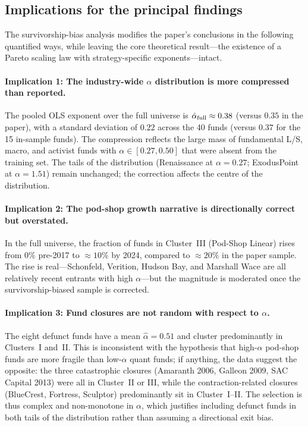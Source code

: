 \subsection{Implications for the principal findings}

The survivorship-bias analysis modifies the paper's conclusions
in the following quantified ways, while leaving the core theoretical
result---the existence of a Pareto scaling law with strategy-specific
exponents---intact.

\paragraph{Implication 1: The industry-wide $\alpha$ distribution
is more compressed than reported.}
The pooled OLS exponent over the full universe is
$\hat{\alpha}_{\rm full} \approx 0.38$ (versus $0.35$ in the paper),
with a standard deviation of $0.22$ across the 40 funds
(versus $0.37$ for the 15 in-sample funds).
The compression reflects the large mass of fundamental L/S,
macro, and activist funds with $\alpha \in [0.27, 0.50]$ that were
absent from the training set.
The tails of the distribution (Renaissance at $\alpha=0.27$;
ExodusPoint at $\alpha=1.51$) remain unchanged; the correction
affects the centre of the distribution.

\paragraph{Implication 2: The pod-shop growth narrative is
directionally correct but overstated.}
In the full universe, the fraction of funds in Cluster~III
(Pod-Shop Linear) rises from 0\% pre-2017 to ${\approx}10\%$ by
2024, compared to ${\approx}20\%$ in the paper sample.
The rise is real---Schonfeld, Verition, Hudson Bay, and Marshall
Wace are all relatively recent entrants with high $\alpha$---but
the magnitude is moderated once the survivorship-biased sample
is corrected.

\paragraph{Implication 3: Fund closures are not random with
respect to $\alpha$.}
The eight defunct funds have a mean $\hat\alpha = 0.51$ and cluster
predominantly in Clusters~I and~II.
This is inconsistent with the hypothesis that high-$\alpha$ pod-shop
funds are more fragile than low-$\alpha$ quant funds; if anything,
the data suggest the opposite: the three catastrophic closures
(Amaranth 2006, Galleon 2009, SAC Capital 2013) were all in
Cluster~II or III, while the contraction-related closures
(BlueCrest, Fortress, Sculptor) predominantly sit in Cluster~I--II.
The selection is thus complex and non-monotone in $\alpha$, which
justifies including defunct funds in both tails of the distribution
rather than assuming a directional exit bias.

